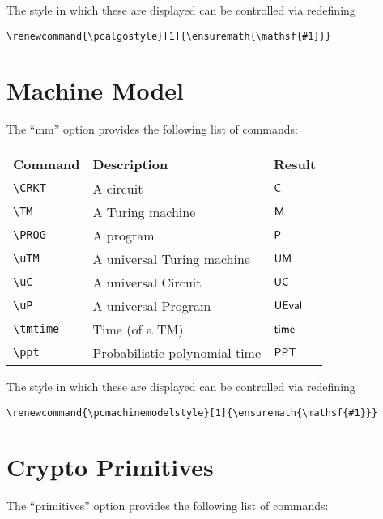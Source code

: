 \documentclass[a4paper]{report}
\begin{document}
The style in which these are displayed can be controlled via redefining
\begin{lstlisting}
\renewcommand{\pcalgostyle}[1]{\ensuremath{\mathsf{#1}}}
\end{lstlisting}


\section{Machine Model}
The \enquote{mm} option provides the following list of commands:

\begin{center}
\begin{tabular}{l l l}
\textbf{Command} & \textbf{Description} & \textbf{Result} \\\hline
\lstinline$\CRKT$ & A circuit & $\CRKT$  \\
\lstinline$\TM$ & A Turing machine & $\TM$  \\
\lstinline$\PROG$ & A program & $\PROG$  \\
\lstinline$\uTM$ & A universal Turing machine & $\uTM$  \\
\lstinline$\uC$ & A universal Circuit & $\uC$  \\
\lstinline$\uP$ & A universal Program & $\uP$  \\
\lstinline$\tmtime$ & Time (of a TM) & $\tmtime$  \\
\lstinline$\ppt$ & Probabilistic polynomial time & $\ppt$  
\end{tabular}
\end{center}

The style in which these are displayed can be controlled via redefining
\begin{lstlisting}
\renewcommand{\pcmachinemodelstyle}[1]{\ensuremath{\mathsf{#1}}}
\end{lstlisting}

\section{Crypto Primitives}
The \enquote{primitives} option provides the following list of commands:
\end{document}
